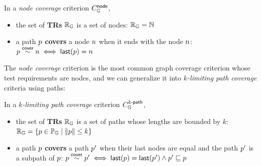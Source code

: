
\begin{definition}\label{def:node-cov} In a \textit{node
  coverage} criterion $C_{\mathbb{G}}^{\textsf{node}}$,
  \begin{itemize}
    \item the set of \textbf{TRs} $\mathbb{R}_{\mathbb{G}}$ is a set of nodes:
      $  \mathbb{R}_{\mathbb{G}} = \mathbb{N} $
    \item a path $p$ \textbf{covers} a node $n$ when it ends with the
      node $n$:
      $  p \overset{\textsf{cover}}{\sim} n \iff \textsf{last}(p) = n $
  \end{itemize}
\end{definition}


The \textit{node coverage} criterion is the most common graph coverage criterion
whose test requirements are nodes, and we can generalize it into
\textit{$k$-limiting path coverage} criteria using paths:


\begin{definition}\label{def:k-path-cov}
  In a \textit{$k$-limiting path coverage} criterion $C_{\mathbb{G}}^{{k}\textsf{-path}}$,
  \begin{itemize}
    \item the set of \textbf{TRs} $\mathbb{R}_{\mathbb{G}}$ is a set of
      paths whose lengths are bounded by $k$:
$
        \mathbb{R}_{\mathbb{G}} = \{ p \in \mathbb{P}_{\mathbb{G}} \mid \lVert{p}\rVert \leq k \}
$
    \item a path $p$ \textbf{covers} a path $p'$ when their last nodes are
      equal and the path $p'$ is a subpath of $p$:
$
        p \overset{\textsf{cover}}{\sim} p'
        \iff
        \textsf{last}(p) = \textsf{last}(p') \wedge p' \sqsubseteq p
$
  \end{itemize}
\end{definition}


